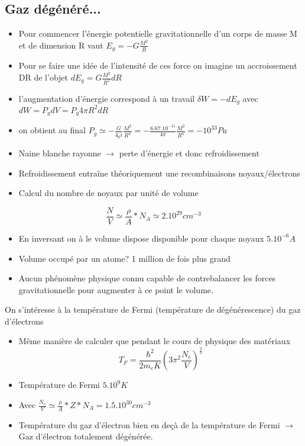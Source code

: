 \documentclass[a4paper]{rapport}
\begin{document}
\subsection{Gaz dégénéré...}

\begin{itemize}
  \item Pour commencer l'énergie potentielle gravitationnelle d'un corps de masse M et de dimension R vaut $E_g = -G \frac{M^2}{R}$
  \item Pour se faire une idée de l’intensité de ces force on imagine un accroissement DR de l'objet $dE_g = G \frac{M^2}{R^2}dR$
  \item l'augmentation d'énergie correspond à un travail $\delta W = -dE_g$ avec $dW  =P_gdV = P_g 4\pi R^2 dR$
  \item on obtient au final $P_g\simeq -\frac{G}{4_pi}\frac{M^2}{R^4} = -\frac{6.67.10^{-11}}{4\pi}\frac{M^2}{R^4} = \boxed{-10^{33} Pa}$
\end{itemize}
\nl
\begin{itemize}
  \item Naine blanche rayonne $\rightarrow$ perte d'énergie et donc refroidissement
  \item Refroidissement entraîne théoriquement une recombinaisons noyaux/électrons
  \item Calcul du nombre de noyaux par unité de volume
\end{itemize}

$$\frac{N}{V}\simeq \frac{\rho}{A}*N_A \simeq 2.10^{29}cm^{-3}$$
\begin{itemize}
  \item En inversant on à le volume dispose disponible pour chaque noyaux $5.10^{-6}A$
  \item Volume occupé par un atome? 1 million de fois plus grand
  \item Aucun phénomène physique connu capable de contrebalancer les forces gravitationnelle pour augmenter à ce point le volume.
\end{itemize}
\nl
On s’intéresse à la température de Fermi (température de dégénérescence) du gaz d'électrons
\begin{itemize}
  \item Même manière de calculer que pendant le cours de physique des matériaux
  $$T_F = \frac{\hbar^2}{2m_e K}\left(3\pi^2 \frac{N_e}{V}\right)^{\frac{2}{3}}$$
  \item Température de Fermi $\boxed{5.10^9 K}$
  \item Avec $\frac{N_e}{V}\simeq \frac{\rho}{A}*Z*N_A = 1.5.10^{30}cm^{-3}$
  \item Température du gaz d'électron bien en deçà de la température de Fermi $\rightarrow$ Gaz d'électron totalement dégénérée.
\end{itemize}
\nl
\end{document}
